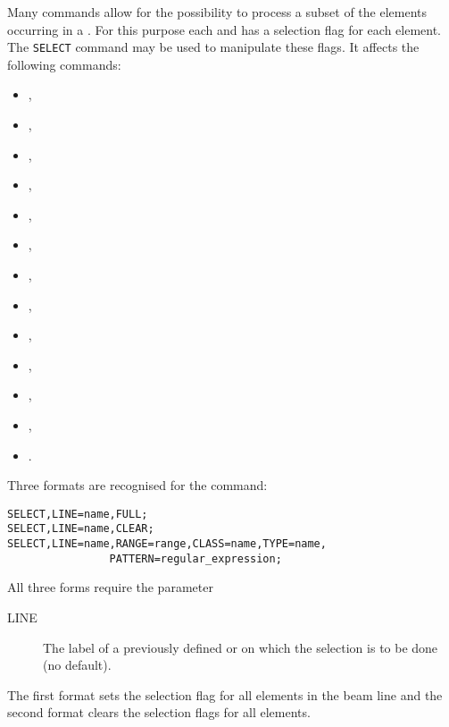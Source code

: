 Many \opal commands allow for the possibility to process
a subset of the elements occurring in a .
For this purpose each  and
 has a selection flag for each element.
The \texttt{SELECT} command may be used to manipulate these flags.
It affects the following commands:
\begin{itemize}
\item {},
\item {},
\item {},
\item {},
\item {},
\item {},
\item {},
\item {},
\item {},
\item {},
\item {},
\item {},
\item {}.
\end{itemize}
Three formats are recognised for the command:
\begin{verbatim}
SELECT,LINE=name,FULL;
SELECT,LINE=name,CLEAR;
SELECT,LINE=name,RANGE=range,CLASS=name,TYPE=name,
                PATTERN=regular_expression;
\end{verbatim}
All three forms require the parameter
\begin{description}
\item[LINE]
  The label of a previously defined  or
   on which the selection is to be done (no default).
\end{description}
The first format sets the selection flag for all elements in the beam line
and the second format clears the selection flags for all elements.

